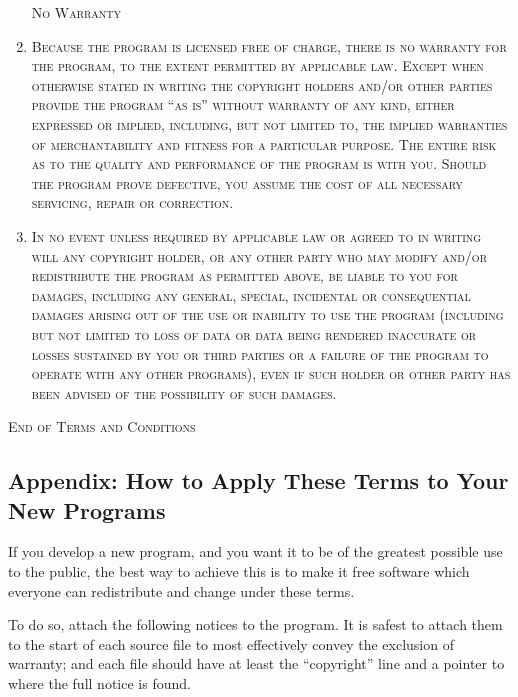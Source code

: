 \begin{enumerate}
  \begin{center}
    \Large \textsc{No Warranty}
  \end{center}

\item \textsc{Because the program is licensed free of
    charge, there is no warranty for the program, to the
    extent permitted by applicable law.  Except when
    otherwise stated in writing the copyright holders and/or
    other parties provide the program ``as is'' without
    warranty of any kind, either expressed or implied,
    including, but not limited to, the implied warranties of
    merchantability and fitness for a particular purpose.
    The entire risk as to the quality and performance of the
    program is with you.  Should the program prove
    defective, you assume the cost of all necessary
    servicing, repair or correction.}

\item \textsc{In no event unless required by applicable law
    or agreed to in writing will any copyright holder, or
    any other party who may modify and/or redistribute the
    program as permitted abo\-ve, be liable to you for
    damages, including any general, special, incidental or
    consequential damages arising out of the use or
    inability to use the program (including but not limited
    to loss of data or data being rendered inaccurate or
    losses sustained by you or third parties or a failure of
    the program to operate with any other programs), even if
    such holder or other party has been advised of the
    possibility of such damages.}
\end{enumerate}

\begin{center}
  \Large \textsc{End of Terms and Conditions}
\end{center}

\subsection*{Appendix: How to Apply These Terms to Your New
  Programs}
If you develop a new program, and you want it to be of the
greatest possible use to the public, the best way to achieve
this is to make it free software which everyone can
redistribute and change under these terms.

To do so, attach the following notices to the program.  It
is safest to attach them to the start of each source file to
most effectively convey the exclusion of warranty; and each
file should have at least the ``copyright'' line and a
pointer to where the full notice is found.


